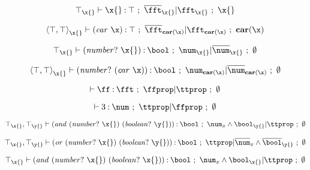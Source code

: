 \documentclass{article}[12pt]
\begin{document}
\newcommand{\xenv}[1]{{#1}_{\x{}}}
\newcommand{\xenvtop}{\xenv{\topty}}
\newcommand{\xyenv}{\xenvtop,\topty_{\y{}}}


\newcommand{\numpx}{\nump{\x{}}}
\newcommand{\boolpx}{\comb{\boolp}{\x{}}}
\newcommand{\boolpy}{\comb{\boolp}{\y{}}}

\newcommand{\cand}[2]{\comb{\andsym}{{#1}\ {#2}}}
\newcommand{\cor}[2]{\comb{\orsym}{{#1}\ {#2}}}

\newcommand{\numbool}{{(\usym\ \num\ \bool)}}
\newcommand{\inumbool}{{(\isym\ \num\ \bool)}}


\begin{displaymath}
  \hastyvar[\xenvtop]{\x{}}{\topty}{\x{}}
\end{displaymath}

\begin{displaymath}
  \hastyvar[{\xenv{\consty{\topty}{\topty}}{}}]{\carx{}}{\topty}{\pecarx{}}
\end{displaymath}

\begin{displaymath}
  \hastypred [\xenvtop] {\numpx} {\num} {\x{}}
\end{displaymath}

\begin{displaymath}
  \hastypred [\xenv{\consty{\topty}{\topty}}] {\nump{\carx}} {\num} {\pecarx}
\end{displaymath}

\begin{displaymath}
  \hastyfalse[\empty]{\ff}{\fft}
\end{displaymath}

\begin{displaymath}
  \hastytrue[\empty]{3}{\num}
\end{displaymath}

\begin{displaymath}
  \hastyeff[\xyenv] {\cand{\numpx}{\boolpy}} {\bool} {\num_{x{}}
    \wedge \bool_{\y{}}}  {\topprop} {\noobj}
\end{displaymath}

\begin{displaymath}
  \hastyeff[\xyenv] {\cor{\numpx}{\boolpy}} {\bool} {\topprop}
  {\comp{\num}_{x{}} \wedge \comp{\bool}_{\y{}}}  {\noobj}
\end{displaymath}

\begin{displaymath}
  \hastyeff[\xenvtop] {\cand{\numpx}{\boolpx}} {\bool} {\num_{x{}} \wedge\bool_{\x{}}}  {\topprop} {\noobj}
\end{displaymath}
\end{document}
